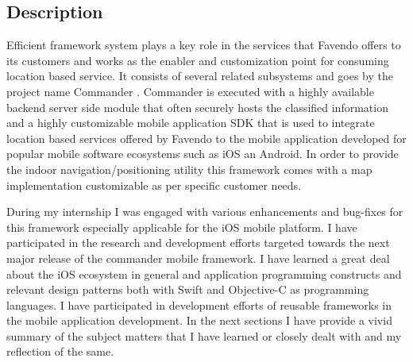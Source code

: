 \subsection{Description}
Efficient framework system plays a key role in the services that Favendo offers to its customers and works as the enabler and customization point for consuming location based service. It consists of several related subsystems and goes by the project name Commander \cite{commanderfavendo}. Commander is executed with a highly available backend server side module that often securely hosts the classified information and a highly customizable mobile application SDK that is used to integrate location based services offered by Favendo to the mobile application developed for popular mobile software ecosystems such as iOS an Android. In order to provide the indoor navigation/positioning utility this framework comes with a map implementation customizable as per specific customer needs.

\par During my internship I was engaged with various enhancements and bug-fixes for this framework especially applicable for the iOS mobile platform. I have participated in the research and development efforts targeted towards the next major release of the commander mobile framework. I have learned a great deal about the iOS ecosystem in general and application programming constructs and relevant design patterns both with Swift and Objective-C as programming languages. I have participated in development efforts of reusable frameworks in the mobile application development. In the next sections I have provide a vivid summary of the subject matters that I have learned or closely dealt with and my reflection of the same. 